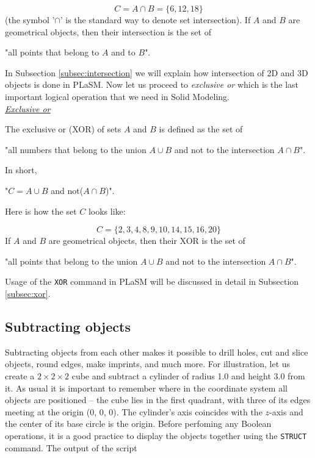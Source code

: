 \documentclass{article}
\begin{document}
$$
C = A \cap B = \{6, 12, 18\}
$$
(the symbol '$\cap$' is the standard way to denote set intersection). If $A$
and $B$ are geometrical objects, then their intersection is the set of \\

\centerline{
"all points that belong to $A$ {\color{red}and} to $B$".
}
\vspace{4mm}
\noindent
In Subsection \ref{subsec:intersection} we will explain how 
intersection of 2D and 3D objects is done in PLaSM. Now let us 
proceed to {\em exclusive or} which is the last important 
logical operation that we need in Solid Modeling.\\

\noindent
\underline{\em Exclusive or}

The exclusive or (XOR) of sets $A$ and $B$ is defined as the set of \\

\centerline{
"all numbers that belong to the union $A \cup B$ {\color{red}and not} to the intersection $A \cap B$".
}
\vspace{4mm}
\noindent
In short,\\

\centerline{
"$C = A \cup B$ {\color{red}and not}($A \cap B$)".
}
\vspace{4mm}
\noindent
Here is how the set $C$ looks like:

$$
C = \{2, 3, 4, 8, 9, 10, 14, 15, 16, 20\}
$$
If $A$ and $B$ are geometrical objects, then their XOR is the set of \\

\centerline{
"all points that belong to the union $A \cup B$ {\color{red}and not} to the intersection $A \cap B$".
}
\vspace{4mm}
\noindent
Usage of the {\tt XOR} command in PLaSM will be discussed in detail 
in Subsection \ref{subsec:xor}.


\subsection{Subtracting objects}\label{subsec:subtract}

Subtracting objects from each other makes it possible 
to drill holes, cut and slice objects, round edges, make 
imprints, and much more. 
For illustration, let us create a $2 \times 2 \times 2$ cube and subtract 
a cylinder of radius 1.0 and height 3.0 from it. As usual it is important to remember where 
in the coordinate system all objects are positioned -- the cube lies in the 
first quadrant, with three of its edges meeting at the origin (0, 0, 0).
The cylinder's axis coincides with the $z$-axis and the center of its base
circle is the origin. Before perfoming any Boolean operations, it is a good 
practice to display the objects together using the {\tt STRUCT} command. The 
output of the script
\end{document}
